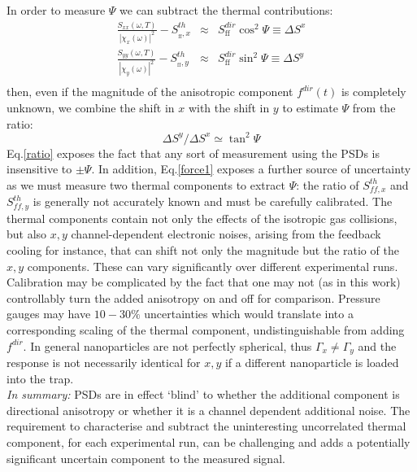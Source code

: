 \documentclass[twocolumn,english,notitlepage,superscriptaddress,nofootinbib]{revtex4-2}
\begin{document}
In order to  measure $\Psi$   we can subtract the thermal contributions:
\begin{eqnarray}
 \frac{S_{xx}(\omega,T)} {|\chi_x(\omega)|^2} -   S^{th}_{_{\text{ff}},x}  &\approx &  S^{dir}_{\text{ff}} \cos^2 \Psi \equiv \Delta S^x  \nonumber  \\
    \frac{S_{yy}(\omega,T)} {|\chi_y(\omega)|^2} - S^{th}_{_{\text{ff}},y}  &\approx & S^{dir}_{\text{ff}} \sin^2 \Psi  \equiv  \Delta S^y \\
    \label{force1}
 \end{eqnarray}
then,  even   if the magnitude of the anisotropic component $ f^{dir}(t)$ is completely unknown,  we  combine the shift in $x$ with the shift in $y$ to estimate $ \Psi$ from the ratio:
\begin{equation}
\label{ratio}
\Delta S^y/\Delta S^x \simeq  \tan^2 \Psi
\end{equation}
Eq.\ref{ratio} exposes the fact that any sort of measurement using the PSDs is insensitive to  $\pm \Psi$.
In addition,  Eq.\ref{force1} exposes a further  source of uncertainty as we must measure two thermal components to extract $\Psi$: 
 the ratio of $S^{th}_{ff,x}$ and $S^{th}_{ff,y}$ is generally not accurately known and must be carefully calibrated.  The thermal components contain not only the effects of the isotropic gas collisions,  but also $x,y$ channel-dependent electronic noises, arising from the feedback cooling for instance,  that can shift not only the magnitude but the ratio of the $x,y$ components.  These can vary significantly over different experimental runs.  Calibration may be complicated by the fact that one may not (as in this work)
controllably turn the added anisotropy on and off for comparison.  Pressure gauges may have $10-30\%$ uncertainties which would translate into a corresponding scaling of the thermal component, undistinguishable
from adding $f^{dir}$.  In general  nanoparticles are not perfectly spherical, thus $\Gamma_x \neq \Gamma_y$ \cite{Rademacher2022} 
and the response is not necessarily identical for $x,y$ if a different nanoparticle is loaded into the trap.\\

{\em In summary:}  PSDs are in effect `blind' to whether the additional component is directional anisotropy or whether it is a channel dependent additional noise.  The requirement to characterise and subtract the uninteresting uncorrelated thermal component,  for each experimental run,  can be challenging and adds a potentially significant uncertain component to the measured signal.
\end{document}
